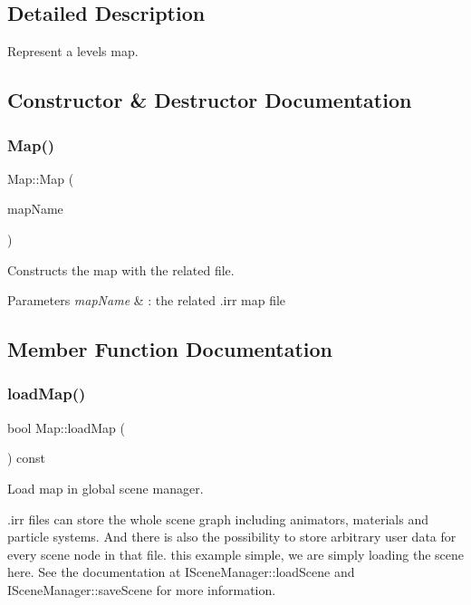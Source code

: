 \subsection{Detailed Description}
Represent a level\textquotesingle{}s map. 

\subsection{Constructor \& Destructor Documentation}
\mbox{\label{classMap_a2e6d2bce865999917deae256baaa434d}} 
\subsubsection{\texorpdfstring{Map()}{Map()}}
{\footnotesize\ttfamily Map\+::\+Map (\begin{DoxyParamCaption}\item[{W\+String const}]{map\+Name }\end{DoxyParamCaption})}



Constructs the map with the related file. 


\begin{DoxyParams}{Parameters}
{\em map\+Name} & \+: the related .irr map file \\
\hline
\end{DoxyParams}


\subsection{Member Function Documentation}
\mbox{\label{classMap_ae085956bff7ba817bb82fc37bb8231df}} 
\subsubsection{\texorpdfstring{load\+Map()}{loadMap()}}
{\footnotesize\ttfamily bool Map\+::load\+Map (\begin{DoxyParamCaption}{ }\end{DoxyParamCaption}) const}



Load map in global scene manager. 

.irr files can store the whole scene graph including animators, materials and particle systems. And there is also the possibility to store arbitrary user data for every scene node in that file. this example simple, we are simply loading the scene here. See the documentation at I\+Scene\+Manager\+::load\+Scene and I\+Scene\+Manager\+::save\+Scene for more information. \mbox{\label{classMap_a7b66b582699a4ea8108eebd86b1aca57}} 
